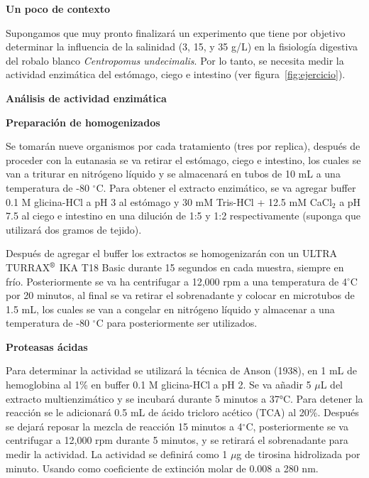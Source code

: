 \documentclass[12pt,a4paper]{article}
\newcommand{\sect}[1]{
	\begin{tcolorbox}[colframe= white,top=2pt, bottom=2pt, colback = gris]
	 \textbf{#1} %
    \end{tcolorbox}
 }
\begin{document}
\begin{multicols}{2}

    \raggedcolumns
    
\sect{Un poco de contexto}

Supongamos que muy pronto finalizar\'a un experimento que tiene por objetivo determinar la influencia de la salinidad (3, 15, y 35 g/L) en la fisiolog\'ia digestiva del robalo blanco \textit{Centropomus undecimalis}. Por lo tanto, se necesita medir la actividad enzim\'atica del est\'omago, ciego e intestino (ver figura~\ref{fig:ejercicio}). 

\sect{An\'alisis de actividad enzim\'atica}

\begin{Exercice}\textbf{ Preparaci\'on de homogenizados}

	Se tomar\'an nueve organismos por cada tratamiento (tres por replica), después de proceder con la eutanasia se va retirar el est\'omago, ciego e intestino, los cuales se van a triturar en nitr\'ogeno l\'iquido y se almacenar\'a en tubos de 10 mL a una temperatura de -80 $^\circ$C. Para obtener el extracto enzim\'atico, se va agregar buffer 0.1 M glicina-HCl a pH 3 al estómago y 30 mM Tris-HCl + 12.5 mM CaCl$_2$ a pH 7.5 al ciego e intestino en una dilución de 1:5 y 1:2 respectivamente (suponga que utilizar\'a dos gramos de tejido).
	
	Despu\'es de agregar el buffer los extractos se homogenizar\'an con un ULTRA TURRAX$^{\mbox{\scriptsize\textregistered}}$  IKA T18 Basic durante 15 segundos en cada muestra, siempre en frío. Posteriormente se va ha centrifugar a 12,000 rpm a una temperatura de 4$^\circ$C por 20 minutos, al final se va retirar el sobrenadante y colocar en microtubos de 1.5 mL, los cuales se van a congelar en nitrógeno líquido y almacenar a una temperatura de -80 $^\circ$C para posteriormente ser utilizados. 
	
\end{Exercice}
    
\begin{Exercice} \textbf{Proteasas ácidas}
	
	Para determinar la actividad se utilizar\'a la técnica de Anson (1938), en 1 mL de hemoglobina al 1\% en buffer 0.1 M glicina-HCl a pH 2. Se va a\~nadir 5 $\mu$L del extracto multienzimático y se incubar\'a durante 5 minutos a 37°C. Para detener la reacción se le adicionar\'a 0.5 mL de ácido tricloro acético (TCA) al 20\%. Después se dejar\'a reposar la mezcla de reacción 15 minutos a 4$^\circ$C, posteriormente se va centrifugar a 12,000 rpm durante 5 minutos, y se retirar\'a el sobrenadante para medir la actividad. La actividad se definir\'a como 1 $\mu$g de tirosina hidrolizada por minuto. Usando como coeficiente de extinción molar de 0.008 a 280 nm.


\end{Exercice}
\end{multicols}
\end{document}
